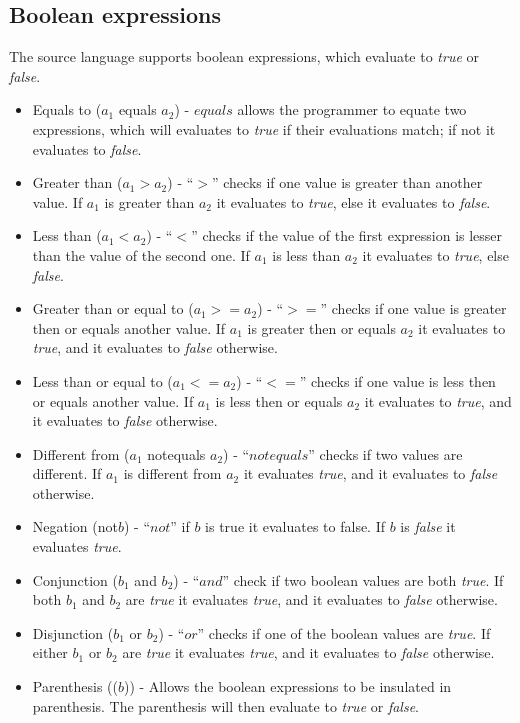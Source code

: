 \subsection{Boolean expressions}
The source language supports boolean expressions, which evaluate to \textit{true} or \textit{false}.
\begin{itemize}
	\item Equals to ($a_1$ equals $a_2$) - $equals$ allows the programmer to equate two expressions, which will evaluates to \textit{true} if their evaluations match; if not it evaluates to \textit{false}.
	\item Greater than ($a_1 > a_2$) - ``$>$'' checks if one value is greater than another value. If $a_1$ is greater than $a_2$ it evaluates to \textit{true}, else it evaluates to \textit{false}.
	\item Less than ($a_1 < a_2$) - ``$<$'' checks if the value of the first expression is lesser than the value of the second one. If $a_1$ is less than $a_2$ it evaluates to \textit{true}, else \textit{false}.
	\item Greater than or equal to ($a_1 >= a_2$) - ``$>=$'' checks if one value is greater then or equals another value. If $a_1$ is greater then or equals $a_2$ it evaluates to \textit{true}, and it evaluates to \textit{false} otherwise.
	\item Less than or equal to ($a_1 <= a_2$) - ``$<=$'' checks if one value is less then or equals another value. If $a_1$ is less then or equals $a_2$ it evaluates to \textit{true}, and it evaluates to \textit{false} otherwise.
	\item Different from ($a_1$ notequals $a_2$) - ``$notequals$'' checks if two values are different. If $a_1$ is different from $a_2$ it evaluates \textit{true}, and it evaluates to \textit{false} otherwise. 
	\item Negation (not$b$) - ``$not$'' if $b$ is true it evaluates to false. If $b$ is \textit{false} it evaluates \textit{true}.
	\item Conjunction ($b_1$ and $b_2$) - ``$and$'' check if two boolean values are both \textit{true}. If both $b_1$ and $b_2$ are \textit{true} it evaluates \textit{true}, and it evaluates to \textit{false} otherwise. 
	\item Disjunction ($b_1$ or $b_2$) - ``$or$'' checks if one of the boolean values are \textit{true}. If either $b_1$ or $b_2$ are \textit{true} it evaluates \textit{true}, and it evaluates to \textit{false} otherwise.
	\item Parenthesis (($b$)) - Allows the boolean expressions to be insulated in parenthesis. The parenthesis will then evaluate to \textit{true} or \textit{false}.
\end{itemize}
